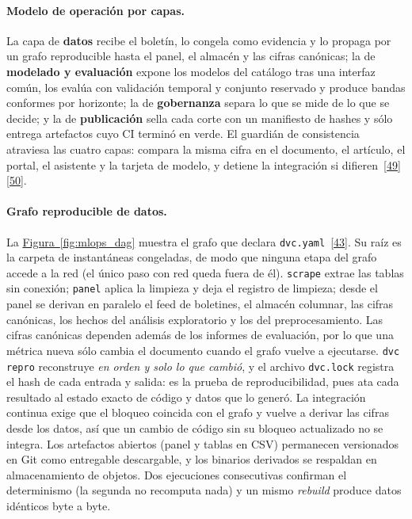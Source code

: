 \documentclass[12pt,letterpaper]{report}
\newcommand{\cita}[1]{\hyperref[bib:#1]{[#1]}}
\begin{document}
\paragraph{Modelo de operación por capas.} La capa de \textbf{datos} recibe el boletín, lo
congela como evidencia y lo propaga por un grafo reproducible hasta el panel, el almacén y las
cifras canónicas; la de \textbf{modelado y evaluación} expone los \factNModels{} modelos del
catálogo tras una interfaz común, los evalúa con validación temporal y conjunto reservado y
produce bandas conformes por horizonte; la de \textbf{gobernanza} separa lo que se mide de lo que
se decide; y la de \textbf{publicación} sella cada corte con un manifiesto de hashes y sólo entrega
artefactos cuyo CI terminó en verde. El guardián de consistencia atraviesa las cuatro capas:
compara la misma cifra en el documento, el artículo, el portal, el asistente y la tarjeta de
modelo, y detiene la integración si difieren~\cita{49}\cita{50}.

\paragraph{Grafo reproducible de datos.} La \hyperref[fig:mlops_dag]{Figura~\ref*{fig:mlops_dag}} muestra el grafo que
declara \texttt{dvc.yaml}~\cita{43}. Su raíz es la carpeta de instantáneas congeladas, de modo
que ninguna etapa del grafo accede a la red (el único paso con red queda fuera de él).
\texttt{scrape} extrae las tablas sin conexión; \texttt{panel} aplica la limpieza y deja el
registro de limpieza; desde el panel se derivan en paralelo el feed de boletines, el almacén
columnar, las cifras canónicas, los hechos del análisis exploratorio y los del preprocesamiento.
Las cifras canónicas dependen además de los informes de evaluación, por lo que una métrica nueva
sólo cambia el documento cuando el grafo vuelve a ejecutarse. \texttt{dvc repro} reconstruye
\textit{en orden y solo lo que cambió}, y el archivo \texttt{dvc.lock} registra el hash de cada
entrada y salida: es la prueba de reproducibilidad, pues ata cada resultado al estado exacto de
código y datos que lo generó. La integración continua exige que el bloqueo coincida con el grafo y
vuelve a derivar las cifras desde los datos, así que un cambio de código sin su bloqueo
actualizado no se integra. Los artefactos abiertos (panel y tablas en CSV) permanecen versionados
en Git como entregable descargable, y los binarios derivados se respaldan en almacenamiento de
objetos. Dos ejecuciones consecutivas confirman el determinismo (la segunda no recomputa nada) y
un mismo \textit{rebuild} produce datos idénticos byte a byte.
\end{document}
